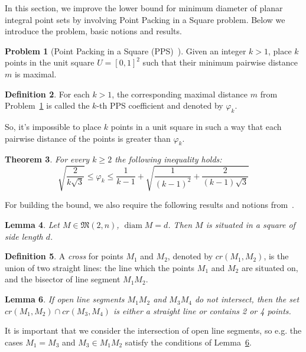 \documentclass[a4paper,14pt]{article} %
\theoremstyle{plain}
\newtheorem{theorem}{Theorem}[section]
\newtheorem{lemma}[theorem]{Lemma}
\theoremstyle{definition}
\newtheorem{definition}[theorem]{Definition}
\newtheorem{problem}[theorem]{Problem}
\begin{document}
In this section,
we improve the lower bound for minimum diameter of planar integral point sets by
involving Point Packing in a Square problem.
Below we introduce the problem, basic notions and results.

\begin{problem}[Point Packing in a Square (PPS)~\cite{locatelli2002packing,costa2013valid}]
	\label{problem:PPS}
	Given an integer $k > 1$, place $k$ points in the unit square $U = [ 0 , 1 ]^2$ such that their
	minimum pairwise distance $m$ is maximal.
\end{problem}

\begin{definition}
	For each $k > 1$, the corresponding maximal distance $m$ from Problem~\ref{problem:PPS}
	is called the $k$-th PPS coefficient and denoted by $\varphi_k$.
\end{definition}
So, it's impossible to place $k$ points in a unit square in such a way that each pairwise distance of the points is greater than $\varphi_k$.


\begin{theorem}
	\label{thm:varphi_k_bounds}
	\cite{costa2013valid}
	For every $k\geq 2$ the following inequality holds:
	\begin{equation*}
		\sqrt{\frac{2}{k\sqrt{3}}}
		\leq
		\varphi_k
		\leq
		\frac{1}{k-1} +
		\sqrt{
			\frac{1}{(k-1)^2}
			+
			\frac{2}{(k-1)\sqrt{3}}
		}
	\end{equation*}
\end{theorem}


For building the bound, we also require the following results and notions from~\cite{our-vmmsh-2018}.

\begin{lemma}
	\cite[Lemma 4]{our-vmmsh-2018}
	\label{lem:square_container}
	Let $M\in\mathfrak{M}(2,n)$, $\operatorname{diam} M = d$.
	Then $M$ is situated in a square of side length $d$.
\end{lemma}

\begin{definition}
	A \textit{cross} for points $M_1$ and $M_2$, denoted by $cr(M_1,M_2)$, is the union of two straight lines:
	the line which the points $M_1$ and $M_2$ are situated on,
	and the bisector of line segment $M_1 M_2$.
\end{definition}

\begin{lemma}
	\label{lem:intervals_cross}
	If open line segments $M_1 M_2$ and $M_3 M_4$ do not intersect,
	then the set $cr(M_1,M_2) \cap cr(M_3,M_4)$ is either a straight line or contains 2 or 4 points.
\end{lemma}
It is important that we consider the intersection of open line segments,
so e.g. the cases $M_1 = M_3$ and $M_3 \in M_1 M_2$ satisfy the conditions of Lemma~\ref{lem:intervals_cross}.
\end{document}
